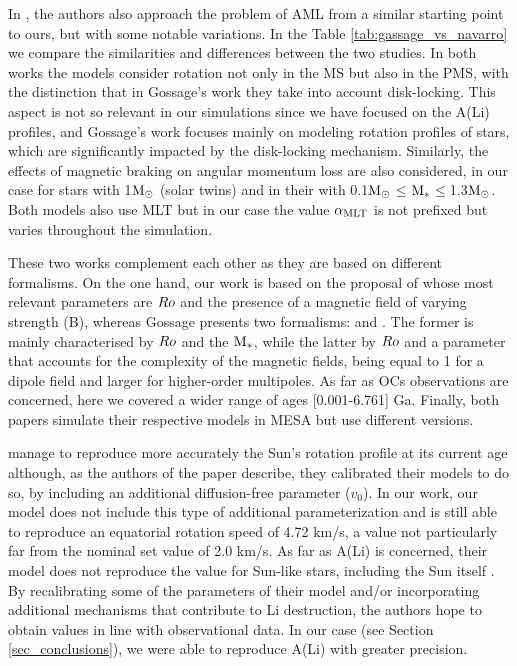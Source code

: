 \documentclass[fleqn,usenatbib]{mnras}
\begin{document}
In \citet{Gossage2021}, the authors also approach the problem of AML from a similar starting point to ours, but with some notable variations. In the Table \ref{tab:gassage_vs_navarro} we compare the similarities and differences between the two studies. In both works the models consider rotation not only in the MS but also in the PMS, with the distinction that in Gossage's work they take into account disk-locking. This aspect is not so relevant in our simulations since we have focused on the A(Li) profiles, and Gossage's work focuses mainly on modeling rotation profiles of stars, which are significantly impacted by the disk-locking mechanism. Similarly, the effects of magnetic braking on angular momentum loss are also considered, in our case for stars with 1$\mathrm{M}_\odot$ (solar twins) and in their with 0.1$\mathrm{M}_\odot$$\le$$\mathrm{M}_*$$\le$1.3$\mathrm{M}_\odot$. Both models also use MLT but in our case the value $\alpha_{\mathrm{MLT}}$ is not prefixed but varies throughout the simulation.\par

These two works complement each other as they are based on different formalisms. On the one hand, our work is based on the proposal of \citet{Gallet2013} whose most relevant parameters are $Ro$ and the presence of a magnetic field of varying strength (B), whereas Gossage presents two formalisms: \citet{Matt2015} and \citet{Garraffo2018}. The former is mainly characterised by $Ro$ and the $\mathrm{M}_*$, while the latter by $Ro$ and a parameter that accounts for the complexity of the magnetic fields, being equal to 1 for a dipole field and larger for higher-order multipoles. As far as OCs observations are concerned, here we covered a wider range of ages [0.001-6.761] Ga. Finally, both papers simulate their respective models in MESA but use different versions.\par

\citet{Gossage2021} manage to reproduce more accurately the Sun's rotation profile at its current age \citep[see][panel (a) in Figures 2, 4 \& 6]{Gossage2021} although, as the authors of the paper describe, they calibrated their models to do so, by including an additional diffusion-free parameter ($v_0$). In our work, our model does not include this type of additional parameterization and is still able to reproduce an equatorial rotation speed of 4.72 km/s, a value not particularly far from the nominal set value of 2.0 km/s. As far as A(Li) is concerned, their model does not reproduce the value for Sun-like stars, including the Sun itself \citep[see][panel (d) in Figures 2 \& 4, and (b) in Figure 6]{Gossage2021}. By recalibrating some of the parameters of their model and/or incorporating additional mechanisms that contribute to Li destruction, the authors hope to obtain values in line with observational data. In our case (see Section \ref{sec_conclusions}), we were able to reproduce A(Li) with greater precision.
\end{document}
